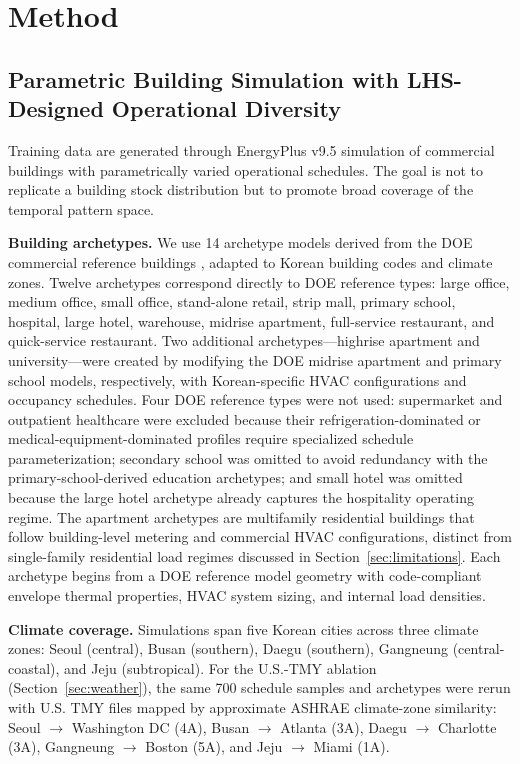 \documentclass[preprint,12pt,authoryear]{elsarticle}
\begin{document}
\section{Method}
\label{sec:method}

\subsection{Parametric Building Simulation with LHS-Designed Operational Diversity}

Training data are generated through EnergyPlus v9.5 \citep{Crawley2001} simulation of commercial buildings with parametrically varied operational schedules. The goal is not to replicate a building stock distribution but to promote broad coverage of the temporal pattern space.

\textbf{Building archetypes.} We use 14 archetype models derived from the DOE commercial reference buildings \citep{Deru2011}, adapted to Korean building codes and climate zones. Twelve archetypes correspond directly to DOE reference types: large office, medium office, small office, stand-alone retail, strip mall, primary school, hospital, large hotel, warehouse, midrise apartment, full-service restaurant, and quick-service restaurant. Two additional archetypes---highrise apartment and university---were created by modifying the DOE midrise apartment and primary school models, respectively, with Korean-specific HVAC configurations and occupancy schedules. Four DOE reference types were not used: supermarket and outpatient healthcare were excluded because their refrigeration-dominated or medical-equipment-dominated profiles require specialized schedule parameterization; secondary school was omitted to avoid redundancy with the primary-school-derived education archetypes; and small hotel was omitted because the large hotel archetype already captures the hospitality operating regime. The apartment archetypes are multifamily residential buildings that follow building-level metering and commercial HVAC configurations, distinct from single-family residential load regimes discussed in Section~\ref{sec:limitations}. Each archetype begins from a DOE reference model geometry with code-compliant envelope thermal properties, HVAC system sizing, and internal load densities.

\textbf{Climate coverage.} Simulations span five Korean cities across three climate zones: Seoul (central), Busan (southern), Daegu (southern), Gangneung (central-coastal), and Jeju (subtropical). For the U.S.-TMY ablation (Section~\ref{sec:weather}), the same 700 schedule samples and archetypes were rerun with U.S. TMY files mapped by approximate ASHRAE climate-zone similarity: Seoul $\to$ Washington DC (4A), Busan $\to$ Atlanta (3A), Daegu $\to$ Charlotte (3A), Gangneung $\to$ Boston (5A), and Jeju $\to$ Miami (1A).
\end{document}
